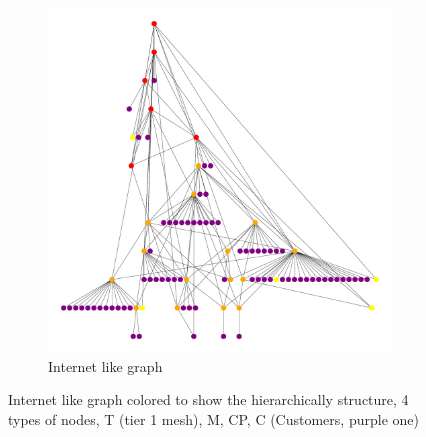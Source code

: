 \begin{figure}[ht]
\begin{subfigure}[b]{0.4\textwidth}
         \includegraphics[width=\textwidth]{images/internet_graph/graph_dot.pdf}
		 \caption{ Internet like graph}
         \label{fig:internet_topology_hierarchical}
     \end{subfigure}
        \caption{Internet like graph colored to show the hierarchically structure,
4 types of nodes, T (tier 1 mesh), M, CP, C (Customers, purple one)}
        \label{fig:internet_like_topology}
\end{figure}

